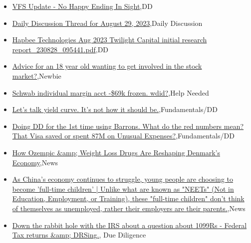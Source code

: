 \documentclass{article}%
\begin{document}
%
\begin{itemize}%
\item%
\href{https://reddit.com/r/wallstreetbets/comments/164f1w2/vfs\_update\_no\_happy\_ending\_in\_sight/}{VFS Update - No Happy Ending In Sight},DD%
\item%
\href{https://reddit.com/r/wallstreetbets/comments/164e7eg/daily\_discussion\_thread\_for\_august\_29\_2023/}{Daily Discussion Thread for August 29, 2023},Daily Discussion%
\item%
\href{https://reddit.com/r/Baystreetbets/comments/163wpm7/hapbee\_technologies\_aug\_2023\_twilight\_capital/}{Hapbee Technologies Aug 2023 Twilight Capital initial research report\_230828\_095441.pdf},DD%
\item%
\href{https://reddit.com/r/StockMarket/comments/16470d6/advice\_for\_an\_18\_year\_old\_wanting\_to\_get\_involved/}{Advice for an 18 year old wanting to get involved in the stock market?},Newbie%
\item%
\href{https://reddit.com/r/StockMarket/comments/1641ygm/schwab\_individual\_margin\_acct\_69k\_frozen\_wdid/}{Schwab individual margin acct -\$69k frozen. wdid?},Help Needed%
\item%
\href{https://reddit.com/r/StockMarket/comments/163tiur/lets\_talk\_yield\_curve\_its\_not\_how\_it\_should\_be/}{Let's talk yield curve. It's not how it should be.},Fundamentals/DD%
\item%
\href{https://reddit.com/r/StockMarket/comments/163ngyt/doing\_dd\_for\_the\_1st\_time\_using\_barrons\_what\_do/}{Doing DD for the 1st time using Barrons. What do the red numbers mean? That Visa saved or spent 87M on Unusual Expenses?},Fundamentals/DD%
\item%
\href{https://reddit.com/r/Economics/comments/163zacn/how\_ozempic\_weight\_loss\_drugs\_are\_reshaping/}{How Ozempic \&amp; Weight Loss Drugs Are Reshaping Denmark's Economy},News%
\item%
\href{https://reddit.com/r/Economics/comments/163yt5p/as\_chinas\_economy\_continues\_to\_struggle\_young/}{As China's economy continues to struggle, young people are choosing to become 'full-time children' | Unlike what are known as "NEETs" (Not in Education, Employment, or Training), these "full-time children" don't think of themselves as unemployed, rather their employers are their parents.},News%
\item%
\href{https://reddit.com/r/Superstonk/comments/1646b61/down\_the\_rabbit\_hole\_with\_the\_irs\_about\_a/}{Down the rabbit hole with the IRS about a question about 1099Rs - Federal Tax returns \&amp; DRSing.}, Due Diligence%
\end{itemize}%
\end{document}
